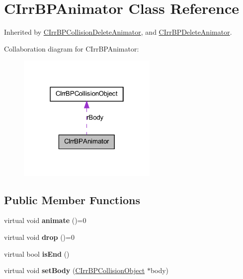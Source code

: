 \hypertarget{class_c_irr_b_p_animator}{
\section{CIrrBPAnimator Class Reference}
\label{class_c_irr_b_p_animator}
}


Inherited by \hyperlink{class_c_irr_b_p_collision_delete_animator}{CIrrBPCollisionDeleteAnimator}, and \hyperlink{class_c_irr_b_p_delete_animator}{CIrrBPDeleteAnimator}.



Collaboration diagram for CIrrBPAnimator:\nopagebreak
\begin{figure}[H]
\begin{center}
\leavevmode
\includegraphics[width=190pt]{class_c_irr_b_p_animator__coll__graph}
\end{center}
\end{figure}
\subsection*{Public Member Functions}
\begin{DoxyCompactItemize}
\item 
\hypertarget{class_c_irr_b_p_animator_ac0c9f71966eb1f8a63138963a5a206d8}{
virtual void {\bfseries animate} ()=0}
\label{class_c_irr_b_p_animator_ac0c9f71966eb1f8a63138963a5a206d8}

\item 
\hypertarget{class_c_irr_b_p_animator_a9de50a01d583d29d8cd43a78f5b03050}{
virtual void {\bfseries drop} ()=0}
\label{class_c_irr_b_p_animator_a9de50a01d583d29d8cd43a78f5b03050}

\item 
\hypertarget{class_c_irr_b_p_animator_a2377f4311835330ee840d71f6f0989ea}{
virtual bool {\bfseries isEnd} ()}
\label{class_c_irr_b_p_animator_a2377f4311835330ee840d71f6f0989ea}

\item 
\hypertarget{class_c_irr_b_p_animator_add9c9e51946dfc2fb60876ed16c67441}{
virtual void {\bfseries setBody} (\hyperlink{class_c_irr_b_p_collision_object}{CIrrBPCollisionObject} $\ast$body)}
\label{class_c_irr_b_p_animator_add9c9e51946dfc2fb60876ed16c67441}

\end{DoxyCompactItemize}
